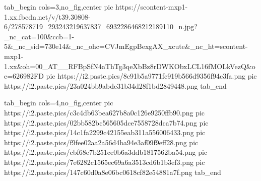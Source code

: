  
 
 
 
 


\ifcmt
  tab_begin cols=3,no_fig,center
     pic https://scontent-mxp1-1.xx.fbcdn.net/v/t39.30808-6/278578719_293243219637837_6932286468212189110_n.jpg?_nc_cat=100&ccb=1-5&_nc_sid=730e14&_nc_ohc=CVJmEgpBexgAX_xcute&_nc_ht=scontent-mxp1-1.xx&oh=00_AT__RFBpSfN4aThTg3qeXbBz8rDWKObxLCL16fMOLkVezQ&oe=626982FD
		 pic https://i2.paste.pics/8c91b5a9771fc919b566d9356f94c3fa.png
		 pic https://i2.paste.pics/23a024bb9abde31b34d28f1bd2849448.png
  tab_end
\fi

\ifcmt
  tab_begin cols=4,no_fig,center
     pic https://i2.paste.pics/c3c4db63bea627b8a0c126e9250ffb90.png
		 pic https://i2.paste.pics/02bb582bc565605dce7558728dca7b74.png
		 pic https://i2.paste.pics/14c1fa2299c42155eab311a556006433.png
		 pic https://i2.paste.pics/f9fee02aa2a56d4ba94e3af09f9eff28.png
		 pic https://i2.paste.pics/cbf68e7b251ce0b6a3ddb1817562ba54.png
		 pic https://i2.paste.pics/7e6282c1565ec69a6a3513cd6b1b3ef3.png
		 pic https://i2.paste.pics/147c60d0a8e06bc0618cf82e54881a7f.png
  tab_end
\fi
